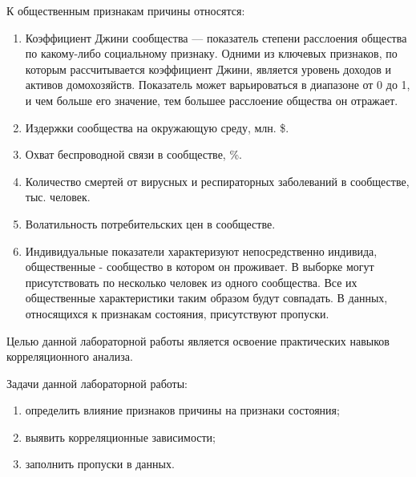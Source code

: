 К общественным признакам причины относятся:
\begin{enumerate}[label*=\arabic*.]
	\item Коэффициент Джини сообщества --- показатель степени расслоения общества по какому-либо социальному признаку. Одними из ключевых признаков, по которым рассчитывается коэффициент Джини, является уровень доходов и активов домохозяйств. Показатель может варьироваться в диапазоне от 0 до 1, и чем больше его значение, тем большее расслоение общества он отражает.
	\item Издержки сообщества на окружающую среду, млн. \$.
	\item Охват беспроводной связи в сообществе, \%.
	\item Количество смертей от вирусных и респираторных заболеваний в сообществе, тыс. человек.
	\item Волатильность потребительских цен в сообществе.
	\item Индивидуальные показатели характеризуют непосредственно индивида, общественные - сообщество в котором он проживает. В выборке могут присутствовать по несколько человек из одного сообщества. Все их общественные характеристики таким образом будут совпадать. В данных, относящихся к признакам состояния, присутствуют пропуски.
\end{enumerate}

Целью данной лабораторной работы является освоение практических навыков корреляционного анализа.

Задачи данной лабораторной работы:
\begin{enumerate}[label*=\arabic*)]
	\item определить влияние признаков причины на признаки состояния;
	\item выявить корреляционные зависимости; 
	\item заполнить пропуски в данных.
\end{enumerate}

\clearpage
